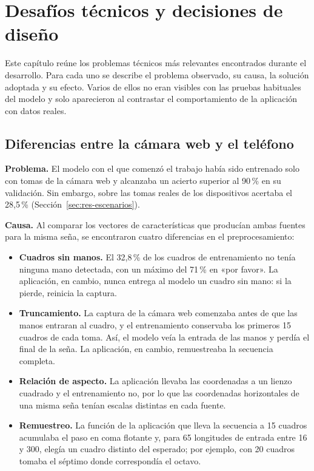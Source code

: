 \chapter{Desafíos técnicos y decisiones de diseño}
\label{cap:desafios}

Este capítulo reúne los problemas técnicos más relevantes encontrados durante el desarrollo. Para cada uno se describe el problema observado, su causa, la solución adoptada y su efecto. Varios de ellos no eran visibles con las pruebas habituales del modelo y solo aparecieron al contrastar el comportamiento de la aplicación con datos reales.

\section{Diferencias entre la cámara web y el teléfono}

\textbf{Problema.} El modelo con el que comenzó el trabajo había sido entrenado solo con tomas de la cámara web y alcanzaba un acierto superior al 90\,\% en su validación. Sin embargo, sobre las tomas reales de los dispositivos acertaba el 28,5\,\% (Sección~\ref{sec:res-escenarios}).

\textbf{Causa.} Al comparar los vectores de características que producían ambas fuentes para la misma seña, se encontraron cuatro diferencias en el preprocesamiento:

\begin{itemize}
    \item \textbf{Cuadros sin manos.} El 32,8\,\% de los cuadros de entrenamiento no tenía ninguna mano detectada, con un máximo del 71\,\% en «por favor». La aplicación, en cambio, nunca entrega al modelo un cuadro sin mano: si la pierde, reinicia la captura.
    \item \textbf{Truncamiento.} La captura de la cámara web comenzaba antes de que las manos entraran al cuadro, y el entrenamiento conservaba los primeros 15 cuadros de cada toma. Así, el modelo veía la entrada de las manos y perdía el final de la seña. La aplicación, en cambio, remuestreaba la secuencia completa.
    \item \textbf{Relación de aspecto.} La aplicación llevaba las coordenadas a un lienzo cuadrado y el entrenamiento no, por lo que las coordenadas horizontales de una misma seña tenían escalas distintas en cada fuente.
    \item \textbf{Remuestreo.} La función de la aplicación que lleva la secuencia a 15 cuadros acumulaba el paso en coma flotante y, para 65 longitudes de entrada entre 16 y 300, elegía un cuadro distinto del esperado; por ejemplo, con 20 cuadros tomaba el séptimo donde correspondía el octavo.
\end{itemize}

